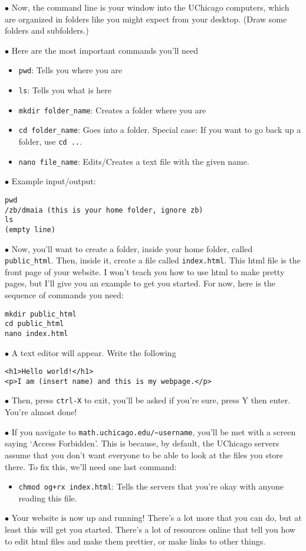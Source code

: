 \documentclass{article}
\newcommand\point[1]{\noindent \hspace{\labelsep} $\bullet$ #1 \smallskip}
\begin{document}
\point{Now, the command line is your window into the UChicago computers, which are organized in folders like you might expect from your desktop. (Draw some folders and subfolders.)}

\point{Here are the most important commands you'll need
\begin{itemize}
\item \lstinline{pwd}: Tells you where you are
\item \lstinline{ls}: Tells you what is here
\item \lstinline{mkdir folder_name}: Creates a folder where you are
\item \lstinline{cd folder_name}: Goes into a folder. Special case: If you want to go back up a folder, use \lstinline{cd ..}.
\item \lstinline{nano file_name}: Edits/Creates a text file with the given name.
\end{itemize}
}

\point{Example input/output:}
\begin{lstlisting}
pwd
/zb/dmaia (this is your home folder, ignore zb)
ls
(empty line)
\end{lstlisting}

\point{Now, you'll want to create a folder, inside your home folder, called \lstinline{public_html}. Then, inside it, create a file called \lstinline{index.html}. This html file is the front page of your website. I won't teach you how to use html to make pretty pages, but I'll give you an example to get you started. For now, here is the sequence of commands you need:}
\begin{lstlisting}
mkdir public_html
cd public_html
nano index.html
\end{lstlisting}

\point{A text editor will appear. Write the following}
\begin{lstlisting}
<h1>Hello world!</h1>
<p>I am (insert name) and this is my webpage.</p>
\end{lstlisting}
\point{Then, press \lstinline{ctrl-X} to exit, you'll be asked if you're sure, press Y then enter. You're almost done!}

\point{If you navigate to \lstinline{math.uchicago.edu/~username}, you'll be met with a screen saying `Access Forbidden'. This is because, by default, the UChicago servers assume that you don't want everyone to be able to look at the files you store there. To fix this, we'll need one last command:
\begin{itemize}
\item \lstinline{chmod og+rx index.html}: Tells the servers that you're okay with anyone reading this file.
\end{itemize}}

\point{Your website is now up and running! There's a lot more that you can do, but at least this will get you started. There's a lot of resources online that tell you how to edit html files and make them prettier, or make links to other things.}
\end{document}
